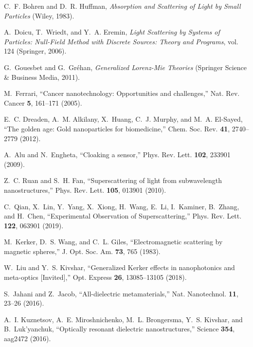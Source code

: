 \documentclass[aps,twocolumn,superscriptaddress]{revtex4-1}
\begin{document}
\begin{thebibliography}{10}
\newcommand{\enquote}[1]{``#1''}

C.~F. Bohren and D.~R. Huffman, \emph{Absorption and Scattering of Light by
  Small Particles} (Wiley, 1983).

A.~Doicu, T.~Wriedt, and Y.~A. Eremin, \emph{Light Scattering by Systems of
  Particles: Null-Field Method with Discrete Sources: Theory and Programs},
  vol. 124 ({Springer}, 2006).

G.~Gouesbet and G.~Gr{\'e}han, \emph{Generalized {{Lorenz}}-{{Mie Theories}}}
  ({Springer Science \& Business Media}, 2011).

M.~Ferrari, \enquote{Cancer nanotechnology: Opportunities and challenges,} Nat.
  Rev. Cancer \textbf{5}, 161--171 (2005).

E.~C. Dreaden, A.~M. Alkilany, X.~Huang, C.~J. Murphy, and M.~A. {El-Sayed},
  \enquote{The golden age: Gold nanoparticles for biomedicine,} Chem. Soc. Rev.
  \textbf{41}, 2740--2779 (2012).

A.~Alu and N.~Engheta, \enquote{Cloaking a sensor,} Phys. Rev. Lett.
  \textbf{102}, 233901 (2009).

Z.~C. Ruan and S.~H. Fan, \enquote{Superscattering of light from subwavelength
  nanostructures,} Phys. Rev. Lett. \textbf{105}, 013901 (2010).

C.~Qian, X.~Lin, Y.~Yang, X.~Xiong, H.~Wang, E.~Li, I.~Kaminer, B.~Zhang, and
  H.~Chen, \enquote{Experimental {{Observation}} of {{Superscattering}},} Phys.
  Rev. Lett. \textbf{122}, 063901 (2019).

M.~Kerker, D.~S. Wang, and C.~L. Giles, \enquote{Electromagnetic scattering by
  magnetic spheres,} J. Opt. Soc. Am. \textbf{73}, 765 (1983).

W.~Liu and Y.~S. Kivshar, \enquote{Generalized {{Kerker}} effects in
  nanophotonics and meta-optics {{[Invited]}},} Opt. Express \textbf{26},
  13085--13105 (2018).

S.~Jahani and Z.~Jacob, \enquote{All-dielectric metamaterials,} Nat.
  Nanotechnol. \textbf{11}, 23--26 (2016).

A.~I. Kuznetsov, A.~E. Miroshnichenko, M.~L. Brongersma, Y.~S. Kivshar, and
  B.~Luk'yanchuk, \enquote{Optically resonant dielectric nanostructures,}
  Science \textbf{354}, aag2472 (2016).


\end{thebibliography}
\end{document}
